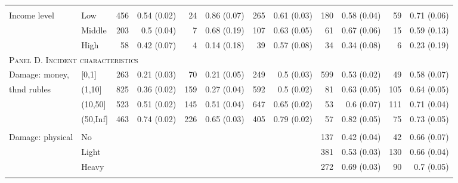 \begin{tabular}{p{1.2in}p{1.2in}rrrrrrrrrr}
	\vspace{1pt}\\
	Income level & Low%
    & 456 & 0.54 (0.02) & 24 & 0.86 (0.07) & 265 & 0.61 (0.03) & 180 & 0.58 (0.04) & 59 & 0.71 (0.06) \\ 
	& Middle%
    & 203 & 0.5 (0.04) & 7 & 0.68 (0.19) & 107 & 0.63 (0.05) & 61 & 0.67 (0.06) & 15 & 0.59 (0.13) \\ 
	& High%
    & 58 & 0.42 (0.07) & 4 & 0.14 (0.18) & 39 & 0.57 (0.08) & 34 & 0.34 (0.08) & 6 & 0.23 (0.19) \\ 
	 \midrule
		\multicolumn{12}{l}{\textsc{Panel D. Incident characteristics}} \\
	Damage: money, %
    & [0,1] & 263 & 0.21 (0.03) & 70 & 0.21 (0.05) & 249 & 0.5 (0.03) & 599 & 0.53 (0.02) & 49 & 0.58 (0.07) \\ 
thnd rubles  & (1,10] & 825 & 0.36 (0.02) & 159 & 0.27 (0.04) & 592 & 0.5 (0.02) & 81 & 0.63 (0.05) & 105 & 0.64 (0.05) \\ 
 & (10,50] & 523 & 0.51 (0.02) & 145 & 0.51 (0.04) & 647 & 0.65 (0.02) & 53 & 0.6 (0.07) & 111 & 0.71 (0.04) \\ 
 & (50,Inf] & 463 & 0.74 (0.02) & 226 & 0.65 (0.03) & 405 & 0.79 (0.02) & 57 & 0.82 (0.05) & 75 & 0.73 (0.05) \\
		\vspace{1pt}\\
	Damage: physical & No & &  & &  & &  & 137 & 0.42 (0.04) & 42 & 0.66 (0.07) \\ 
 & Light & &  & &  & &  & 381 & 0.53 (0.03) & 130 & 0.66 (0.04) \\ 
  & Heavy & &  & &  & &  & 272 & 0.69 (0.03) & 90 & 0.7 (0.05) \\ 
		\vspace{1pt}\\

\end{tabular}
